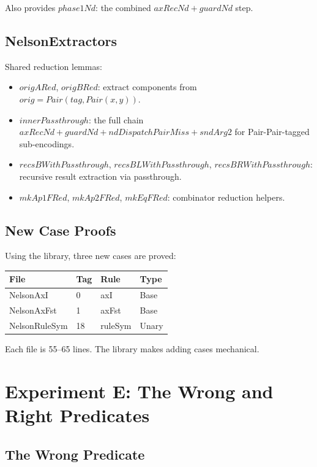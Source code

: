 \documentclass[11pt]{article}
\begin{document}
Also provides $\mathit{phase1Nd}$: the combined
$\mathit{axRecNd} + \mathit{guardNd}$ step.

\subsection{NelsonExtractors}

Shared reduction lemmas:
\begin{itemize}
\item $\mathit{origARed}$, $\mathit{origBRed}$: extract components
  from $\mathit{orig} = \mathit{Pair}(\mathit{tag}, \mathit{Pair}(x,y))$.
\item $\mathit{innerPassthrough}$: the full chain
  $\mathit{axRecNd} + \mathit{guardNd} + \mathit{ndDispatchPairMiss}
  + \mathit{sndArg2}$ for Pair-Pair-tagged sub-encodings.
\item $\mathit{recsBWithPassthrough}$, $\mathit{recsBLWithPassthrough}$,
  $\mathit{recsBRWithPassthrough}$: recursive result extraction
  via passthrough.
\item $\mathit{mkAp1FRed}$, $\mathit{mkAp2FRed}$, $\mathit{mkEqFRed}$:
  combinator reduction helpers.
\end{itemize}

\subsection{New Case Proofs}

Using the library, three new cases are proved:
\begin{center}
\begin{tabular}{llll}
\hline
\textbf{File} & \textbf{Tag} & \textbf{Rule} & \textbf{Type} \\
\hline
NelsonAxI & 0 & axI & Base \\
NelsonAxFst & 1 & axFst & Base \\
NelsonRuleSym & 18 & ruleSym & Unary \\
\hline
\end{tabular}
\end{center}

Each file is 55--65 lines. The library makes adding cases mechanical.

\section{Experiment E: The Wrong and Right Predicates}

\subsection{The Wrong Predicate}
\end{document}
